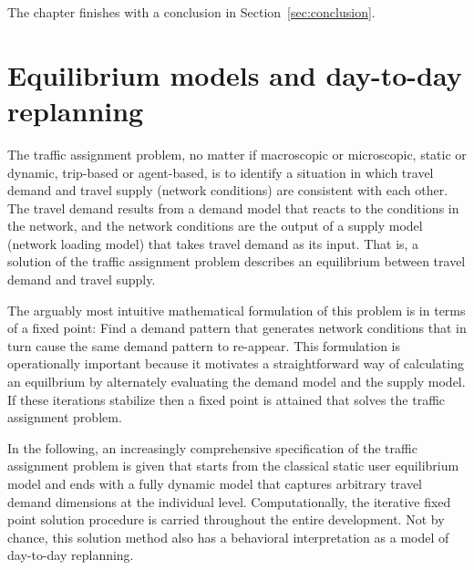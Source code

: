 The chapter finishes with a conclusion in Section~\ref{sec:conclusion}.






\section{Equilibrium models and day-to-day replanning}
\label{sec:equil-models-day}

The traffic assignment problem, no matter if macroscopic or
microscopic, static or dynamic, trip-based or agent-based, is to
identify a situation in which travel demand and travel supply (network
conditions) are consistent with each other. The travel demand results
from a demand model that reacts to the conditions in the network, and
the network conditions are the output of a supply model
(network loading model) that takes travel demand as its input. That
is, a solution of the traffic assignment problem describes an 
equilibrium between travel demand and travel supply.

The arguably most intuitive mathematical formulation of this problem is in terms of a fixed point: Find a demand pattern that generates network conditions that in turn cause the same demand pattern to re-appear. This formulation is operationally important because it motivates a straightforward way of calculating an equilbrium by alternately evaluating the demand model and the supply model. If these iterations stabilize then a fixed point is attained that solves the traffic assignment problem.

In the following, an increasingly comprehensive specification of the traffic assignment problem is given that starts from the classical static user equilibrium model and ends with a fully dynamic model that captures arbitrary travel demand dimensions at the individual level. Computationally, the iterative fixed point solution procedure is carried throughout the entire development. Not by chance, this solution method also has a behavioral interpretation as a model of day-to-day replanning.

